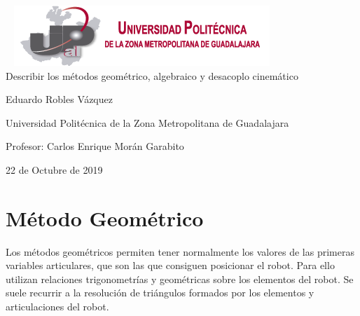 \documentclass[11pt,a4paper,oldfontcommands,oneside]{memoir}
\begin{document}
%
%
\thispagestyle{empty}

{%
\sffamily
\centering
\Large

~\vspace{\fill}
\includegraphics[scale=1]{logo1.png} \\
{\huge 
\vspace{4cm}
Describir los métodos geométrico, algebraico y desacoplo cinemático
}
\vspace{2.5cm}

{\LARGE
Eduardo Robles Vázquez
}

\vspace{2.5cm}

Universidad Politécnica de la Zona Metropolitana de Guadalajara

\vspace{3.5cm}

Profesor: Carlos Enrique Morán Garabito

\vspace{\fill}

22 de Octubre de 2019

}%

\vspace{.5cm}
\hfill\break




\tableofcontents*

\clearpage

\chapter{Método Geométrico}
Los métodos geométricos permiten tener normalmente los valores de las primeras variables articulares, que son las que consiguen posicionar el robot. Para ello utilizan relaciones trigonometrías y geométricas sobre los elementos del robot. Se suele recurrir a la resolución de triángulos formados por los elementos y articulaciones del robot. 
\\
\end{document}
